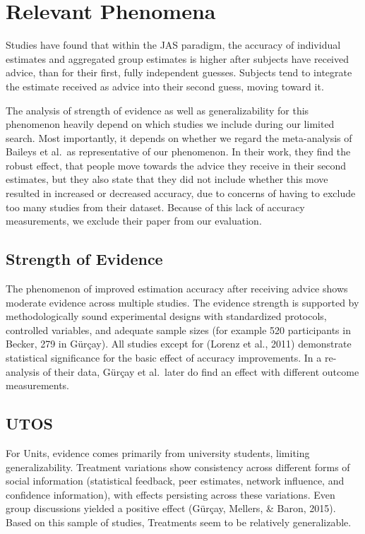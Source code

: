 \documentclass[
  man,floatsintext]{apa6}
\begin{document}
\hypertarget{relevant-phenomena}{%
\section{Relevant Phenomena}\label{relevant-phenomena}}

Studies have found that within the JAS paradigm, the accuracy of individual estimates and aggregated group estimates is higher after subjects have received advice, than for their first, fully independent guesses. Subjects tend to integrate the estimate received as advice into their second guess, moving toward it.

The analysis of strength of evidence as well as generalizability for this phenomenon heavily depend on which studies we include during our limited search. Most importantly, it depends on whether we regard the meta-analysis of Baileys et al.~as representative of our phenomenon. In their work, they find the robust effect, that people move towards the advice they receive in their second estimates, but they also state that they did not include whether this move resulted in increased or decreased accuracy, due to concerns of having to exclude too many studies from their dataset. Because of this lack of accuracy measurements, we exclude their paper from our evaluation.

\hypertarget{strength-of-evidence}{%
\subsection{Strength of Evidence}\label{strength-of-evidence}}

The phenomenon of improved estimation accuracy after receiving advice shows moderate evidence across multiple studies. The evidence strength is supported by methodologically sound experimental designs with standardized protocols, controlled variables, and adequate sample sizes (for example 520 participants in Becker, 279 in Gürçay). All studies except for (Lorenz et al., 2011) demonstrate statistical significance for the basic effect of accuracy improvements. In a re-analysis of their data, Gürçay et al.~later do find an effect with different outcome measurements.

\hypertarget{utos}{%
\subsection{UTOS}\label{utos}}

For Units, evidence comes primarily from university students, limiting generalizability. Treatment variations show consistency across different forms of social information (statistical feedback, peer estimates, network influence, and confidence information), with effects persisting across these variations. Even group discussions yielded a positive effect (Gürçay, Mellers, \& Baron, 2015). Based on this sample of studies, Treatments seem to be relatively generalizable.
\end{document}
